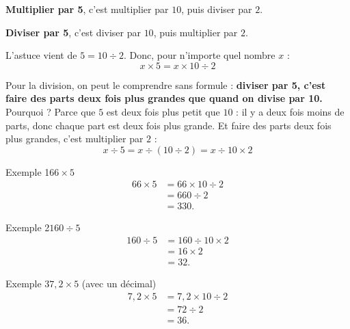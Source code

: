 \begin{astuce}
\begin{compactitem}
\item \textbf{Multiplier par 5}, c'est multiplier par $10$, puis diviser par $2$.
\item \textbf{Diviser par 5}, c'est diviser par $10$, puis multiplier par $2$.
\end{compactitem}
\end{astuce}

\begin{theorie}
L'astuce vient de $5 = 10 \div 2$. Donc, pour n'importe quel nombre $x$ :
\[ x \times 5 = x \times 10 \div 2 \]

Pour la division, on peut le comprendre sans formule : \textbf{diviser par 5, c'est
faire des parts deux fois plus grandes que quand on divise par 10.} Pourquoi ? Parce
que $5$ est deux fois plus petit que $10$ : il y a deux fois moins de parts, donc
chaque part est deux fois plus grande. Et faire des parts deux fois plus grandes,
c'est multiplier par $2$ :
\[ x \div 5 = x \div (10 \div 2) = x \div 10 \times 2 \]
\end{theorie}


\begin{exemple}{Exemple 1}{$66 \times 5$}
\begin{align*}
  66 \times 5 &= 66 \times 10 \div 2 \\
              &= 660 \div 2 \\
              &= 330.
\end{align*}
\end{exemple}

\begin{exemple}{Exemple 2}{$160 \div 5$}
\begin{align*}
  160 \div 5 &= 160 \div 10 \times 2 \\
             &= 16 \times 2 \\
             &= 32.
\end{align*}
\end{exemple}

\begin{exemple}{Exemple 3}{$7{,}2 \times 5$ (avec un décimal)}
\begin{align*}
  7{,}2 \times 5 &= 7{,}2 \times 10 \div 2 \\
                 &= 72 \div 2 \\
                 &= 36.
\end{align*}
\end{exemple}

